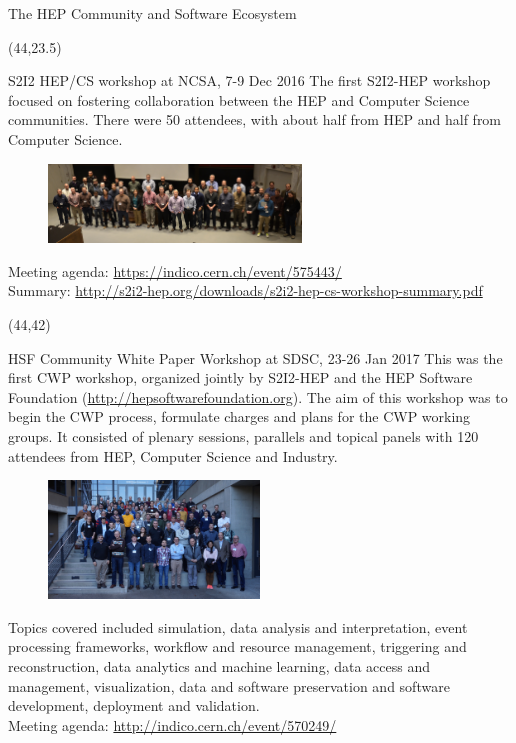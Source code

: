 \documentclass[final]{beamer}
\begin{document}
\begin{frame}{}
\begin{textblock}{38.0}
\begin{block}{The HEP Community and Software Ecosystem}
\end{block}
\end{textblock}




\begin{textblock}{38.0}(44,23.5)
\begin{block}{S2I2 HEP/CS workshop at NCSA, 7-9 Dec 2016}
The first S2I2-HEP workshop focused on fostering collaboration between the HEP and Computer Science communities. There were 50 attendees, with about half from HEP and half from Computer Science.
\begin{figure}[tbph]
\centering
\includegraphics[width=0.60\textwidth]{images/20161208-s2i2-hep-cs-group-photo.jpg}
\end{figure}
\small{Meeting agenda: \url{https://indico.cern.ch/event/575443/}} \\
\small{Summary: \url{http://s2i2-hep.org/downloads/s2i2-hep-cs-workshop-summary.pdf}}
\end{block}
\end{textblock}

\begin{textblock}{38.0}(44,42)
\begin{block}{HSF Community White Paper Workshop at SDSC, 23-26 Jan 2017}
This was the first CWP workshop, organized jointly by S2I2-HEP and the HEP Software Foundation (\url{http://hepsoftwarefoundation.org}). The aim of this workshop was to begin the CWP process, formulate charges and plans for the CWP working groups. It consisted of plenary sessions, parallels and topical panels with 120 attendees from HEP, Computer Science and Industry.
\begin{figure}[tbph]
\centering
\includegraphics[width=0.50\textwidth]{images/20170125-HSF-SDSC-Workshop-group-photo.jpg}
\end{figure}
Topics covered included simulation, data analysis and interpretation, event processing frameworks, workflow and resource management, triggering and reconstruction, data analytics and machine learning, data access and management, visualization, data and software preservation and software development, deployment and validation. \\
\small{Meeting agenda: \url{http://indico.cern.ch/event/570249/}} \\


\end{block}
\end{textblock}
\end{frame}
\end{document}

